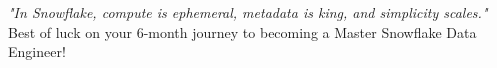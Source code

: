 \documentclass[11pt, a4paper]{article}
\begin{document}
\vspace{1cm}
\begin{center}
    \textit{"In Snowflake, compute is ephemeral, metadata is king, and simplicity scales."} \\
    Best of luck on your 6-month journey to becoming a Master Snowflake Data Engineer!
\end{center}
\end{document}
